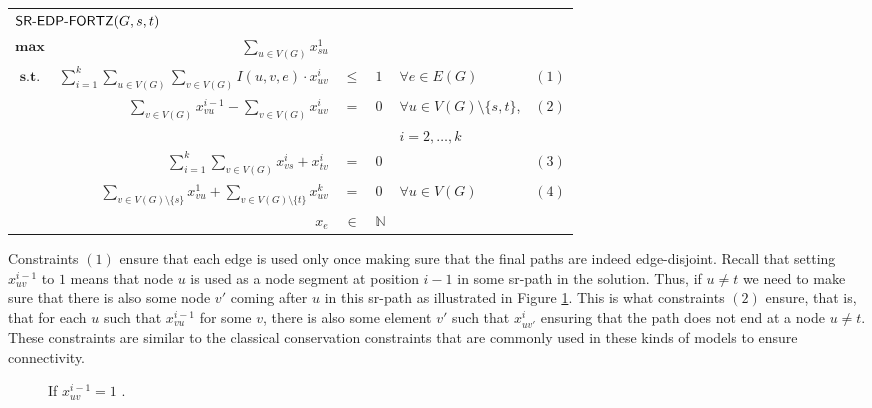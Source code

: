 \begin{center}
\begin{tabular}{crcllr}
\multicolumn{5}{l}{$\textsf{SR-EDP-FORTZ}(G, s, t)$} \\[0.5cm] 
$\displaystyle \mathbf{max}$ & $\displaystyle \sum_{u \in V(G)} x^1_{su}$ & & & & \\[0.5cm]
$\textbf{s.t.}$ & $\displaystyle \sum_{i = 1}^k \sum_{u \in V(G)} \sum_{v \in V(G)} I(u, v, e) \cdot x^i_{uv} $ & $\leq$    & $1$ & $\forall e \in E(G)$  & $(1)$ \\[0.5cm]
                & $\displaystyle \sum_{v \in V(G)} x^{i - 1}_{vu} - \sum_{v \in V(G)} x^i_{uv}$ & $=$ & $0$ & $\forall u \in V(G) \setminus \{s, t\}$, &  $(2)$ \\[-0.2cm] 
                & & & & $i = 2, \ldots, k$ &  \\[0.5cm] 
                & $\displaystyle \sum_{i = 1}^k \sum_{v \in V(G)} x^i_{vs} + x^i_{tv}$ & $=$ & $0$ &  & $(3)$ \\[0.5cm]
                & $\displaystyle \sum_{v \in V(G) \setminus \{s\}} x^1_{vu} + \sum_{v \in V(G) \setminus \{t\}} x^k_{uv}$ & $=$ & $0$ & $\forall u \in V(G)$ & $(4)$\\[0.5cm]
                & $x_{e}$ & $\in$ & $\mathbb{N}$
\end{tabular}
\end{center}

Constraints $(1)$ ensure that each edge is used only once making sure that the final paths are indeed edge-disjoint. Recall that setting $x^{i - 1}_{uv}$ to $1$ means that
node $u$ is used as a node segment at position $i - 1$ in some sr-path in the solution. Thus, if $u \neq t$ we need to make sure that there is also some node $v'$ coming after $u$ in this sr-path as
illustrated in Figure \ref{fig:modelfortz2}. This is what constraints $(2)$ ensure, that is, that for each $u$ such that $x^{i - 1}_{vu}$ for some $v$, there is also some element
$v'$ such that $x^{i}_{uv'}$ ensuring that the path does not end at a node $u \neq t$. 
These constraints are similar to the classical conservation constraints that are commonly used in these kinds of models to ensure connectivity.



\begin{figure}
\begin{center}
\end{center}
\caption{If $x^{i - 1}_{uv} = 1$ .}
\label{fig:modelfortz2}
\end{figure}

